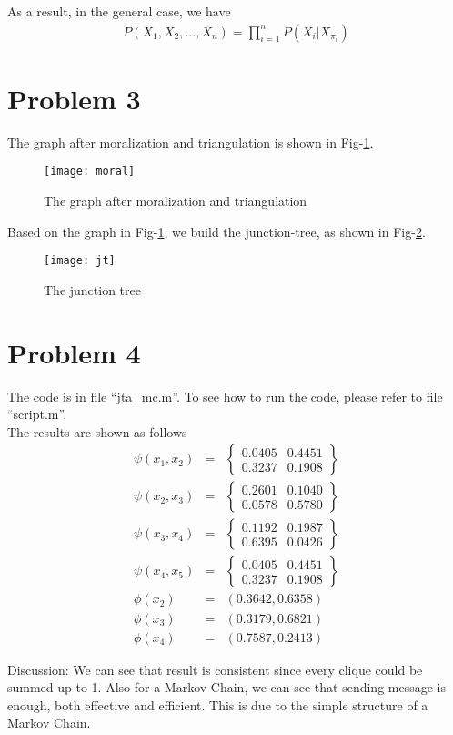\documentclass[12pt]{article}
\begin{document}
As a result, in the general case, we have
\begin{eqnarray*}
  P(X_1, X_2, \dots, X_n) = \prod_{i=1}^n P(X_i | X_{\pi_i})
\end{eqnarray*}

\section*{Problem 3}

The graph after moralization and triangulation is shown in Fig-\ref{fig:moral}. \\

\begin{figure}[ht!]
  \centering
  \texttt{[image: moral]}
  \caption{The graph after moralization and triangulation \label{fig:moral}}
\end{figure}

Based on the graph in Fig-\ref{fig:moral}, we build the junction-tree, as shown in Fig-\ref{fig:jt}.

\begin{figure}[ht!]
  \centering
  \texttt{[image: jt]}
  \caption{The junction tree \label{fig:jt}}
\end{figure}

\section*{Problem 4}

The code is in file ``jta\_mc.m''. To see how to run the code, please refer to file ``script.m''. \\

The results are shown as follows
\begin{eqnarray*}
  \psi(x_1, x_2) &=&
  \begin{Bmatrix}
    0.0405   & 0.4451 \\
    0.3237   & 0.1908
  \end{Bmatrix} \\
  \psi(x_2, x_3) &=&
  \begin{Bmatrix}
    0.2601 & 0.1040 \\
    0.0578 & 0.5780
  \end{Bmatrix} \\
  \psi(x_3, x_4) &=&
  \begin{Bmatrix}
    0.1192   &	0.1987 \\
    0.6395   &	0.0426
  \end{Bmatrix} \\
  \psi(x_4, x_5) &=&
  \begin{Bmatrix}
    0.0405   &  0.4451 \\
    0.3237   &  0.1908
  \end{Bmatrix} \\
  \phi(x_2) &=& (0.3642, 0.6358) \\
  \phi(x_3) &=& (0.3179, 0.6821) \\
  \phi(x_4) &=& (0.7587, 0.2413)
\end{eqnarray*}

Discussion: We can see that result is consistent since every clique could be summed up to 1. Also for a Markov Chain, we can see that sending message is enough, both effective and efficient. This is due to the simple structure of a Markov Chain.
\end{document}
